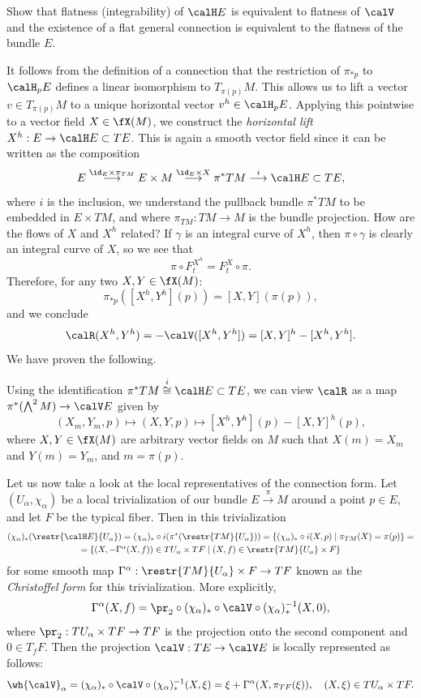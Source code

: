 \begin{xca}
    Show that flatness (integrability) of $\calH E$ is equivalent to flatness of $\calV$ and the existence of a flat general connection is equivalent to the flatness of the bundle $E$.
\end{xca}

It follows from the definition of a connection that the restriction of $\pi_{\ast p}$ to $\calH_pE$ defines a linear isomorphism to $T_{\pi(p)}M$.
This allows us to lift a vector $v\in T_{\pi(p)}M$ to a unique horizontal vector $v^h\in \calH_pE$. Applying this pointwise to a vector field $X\in\fX(M)$, we construct the \emph{horizontal lift} $X^h:E\to \calH E\subset TE$. This is again a smooth vector field since it can be written as the composition
\[E\overset{\id_E\times \pi_{TM}}{\longrightarrow}E\times M \overset{\id_E\times X}{\longrightarrow}\pi^\ast TM \overset{i}{\longrightarrow}\calH E\subset TE,\]
where $i$ is the inclusion, we understand the pullback bundle $\pi^\ast TM$ to be embedded in $E\times TM$, and where $\pi_{TM}:TM\to M$ is the bundle projection. How are the flows of $X$ and $X^h$ related? If $\gamma$ is an integral curve of $X^h$, then $\pi\circ\gamma$ is clearly an integral curve of $X$, so we see that 
\[\pi\circ F^{X^h}_t=F^{X}_t\circ \pi.\]
Therefore, for any two $X,Y\in \fX(M)$:
\[\pi_{\ast p}([X^h,Y^h](p))=[X,Y](\pi(p)),\]
and we conclude
\[\calR(X^h,Y^h)=-\calV([X^h,Y^h])=[X,Y]^h-[X^h,Y^h].\]
We have proven the following.

\begin{cor}\label{cor curvature in terms of hor}
    Using the identification $\pi^\ast TM\overset{i}{\cong}\calH E\subset TE$, we can view $\calR$ as a map $\pi^\ast(\bigwedge^2M)\to \calV E$ given by 
    \[(X_m,Y_m,p)\mapsto (X,Y,p)\mapsto [X^h,Y^h](p)-[X,Y]^h(p),\]
    where $X,Y\in \fX(M)$ are arbitrary vector fields on $M$ such that $X(m)=X_m$ and $Y(m)=Y_m$, and $m=\pi(p)$.
\end{cor}

Let us now take a look at the local representatives of the connection form. Let $(U_\alpha,\chi_\alpha)$ be a local trivialization of our bundle $E\overset{\pi}{\to}M$ around a point $p\in E$, and let $F$ be the typical fiber. Then in this trivialization
\begin{multline}
    (\chi_\alpha)_\ast(\restr{\calH E}{U_\alpha})=(\chi_\alpha)_\ast\circ i(\pi^\ast (\restr{TM}{U_\alpha}))=\{(\chi_\alpha)_\ast\circ i(X,p)\mid \pi_{TM}(X)=\pi(p)\}=\\
    =\{(X,-\Gamma^\alpha(X,f))\in TU_\alpha\times TF\mid (X,f)\in \restr{TM}{U_\alpha}\times F\}
\end{multline}
for some smooth map $\Gamma^\alpha:\restr{TM}{U_\alpha}\times F\to TF$ known as the \emph{Christoffel form} for this trivialization. More explicitly,
\[\Gamma^\alpha(X,f)=\pr_2\circ (\chi_\alpha)_\ast\circ \calV\circ (\chi_\alpha)_\ast^{-1}(X,0),\]
where $\pr_2:TU_\alpha\times TF\to TF$ is the projection onto the second component and $0 \in T_fF$. Then the projection $\calV:TE\to \calV E$ is locally represented as follows:
\[\wh{\calV}_\alpha=(\chi_\alpha)_\ast\circ \calV\circ (\chi_\alpha)_\ast^{-1}(X,\xi)=\xi+\Gamma^\alpha(X,\pi_{TF}(\xi)),\quad (X,\xi)\in TU_\alpha\times TF.\]

